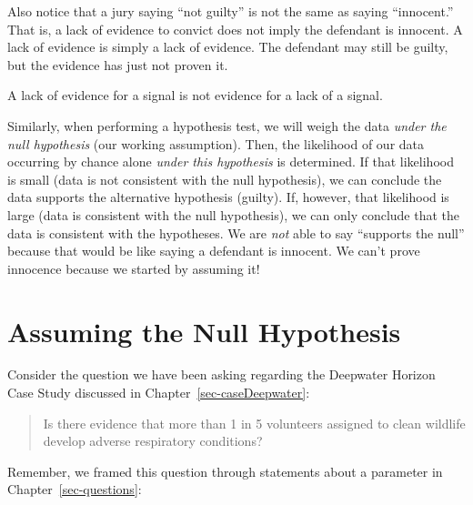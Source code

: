 \documentclass[
  letterpaper,
  DIV=11,
  numbers=noendperiod]{scrreprt}
\theoremstyle{plain}
\theoremstyle{definition}
\theoremstyle{definition}
\theoremstyle{remark}
\begin{document}
Also notice that a jury saying ``not guilty'' is not the same as saying
``innocent.'' That is, a lack of evidence to convict does not imply the
defendant is innocent. A lack of evidence is simply a lack of evidence.
The defendant may still be guilty, but the evidence has just not proven
it.

\begin{tcolorbox}[enhanced jigsaw, breakable, titlerule=0mm, colframe=quarto-callout-tip-color-frame, bottomtitle=1mm, opacityback=0, rightrule=.15mm, toptitle=1mm, arc=.35mm, bottomrule=.15mm, left=2mm, title=\textcolor{quarto-callout-tip-color}{\faLightbulb}\hspace{0.5em}{Big Idea}, leftrule=.75mm, coltitle=black, toprule=.15mm, colbacktitle=quarto-callout-tip-color!10!white, colback=white, opacitybacktitle=0.6]

A lack of evidence for a signal is not evidence for a lack of a signal.

\end{tcolorbox}

Similarly, when performing a hypothesis test, we will weigh the data
\emph{under the null hypothesis} (our working assumption). Then, the
likelihood of our data occurring by chance alone \emph{under this
hypothesis} is determined. If that likelihood is small (data is not
consistent with the null hypothesis), we can conclude the data supports
the alternative hypothesis (guilty). If, however, that likelihood is
large (data is consistent with the null hypothesis), we can only
conclude that the data is consistent with the hypotheses. We are
\emph{not} able to say ``supports the null'' because that would be like
saying a defendant is innocent. We can't prove innocence because we
started by assuming it!

\section{Assuming the Null
Hypothesis}\label{assuming-the-null-hypothesis}

Consider the question we have been asking regarding the Deepwater
Horizon Case Study discussed in Chapter~\ref{sec-caseDeepwater}:

\begin{quote}
Is there evidence that more than 1 in 5 volunteers assigned to clean
wildlife develop adverse respiratory conditions?
\end{quote}

Remember, we framed this question through statements about a parameter
in Chapter~\ref{sec-questions}:
\end{document}
